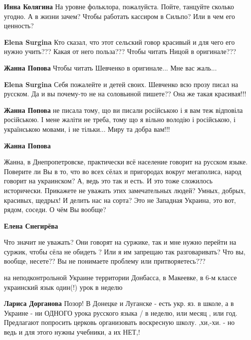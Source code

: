 \begin{itemize}
\begin{itemize}
\textbf{Инна Колягина}
На уровне фольклора, пожалуйста. Пойте, танцуйте сколько угодно. А в жизни зачем? Чтобы работать кассиром в Сильпо? Или в чем его ценность?

\textbf{Elena Surgina}
Кто сказал, что этот сельский говор красивый и для чего его нужно учить??? Какая от него польза??? Чтобы читать Ницой в оригинале???

\textbf{Жанна Попова} Чтобы читать Шевченко в оригинале... Мне вас жаль...

\textbf{Elena Surgina}
Себя пожалейте и детей своих. Шевченко всю прозу писал на русском. Да и вы почему-то не на соловьиной пишете?? Она же такая красивая!!!

\textbf{Жанна Попова} не писала тому, що ви писали російською і я вам теж відповіла російською. І мене жаліти не треба, тому що я вільно володію і російською, і українською мовами, і не тільки... Миру та добра вам!!!

\textbf{Жанна Попова} 

Жанна, в Днепропетровске, практически всё население говорит на русском языке.
Поверите ли Вы в то, что во всех сёлах и пригородах вокруг мегаполиса, народ
говорит на украинском? А, ведь это так и есть. И это тоже сложилось
исторически. Прикажете не уважать этих замечательных людей? Умных, добрых,
красивых, щедрых! И делить нас на сорта? Это не Западная Украина, это вот,
рядом, соседи. О чём Вы вообще?

\textbf{Елена Снегирёва}

Что значит не уважать? Они говорят на суржике, так и мне нужно перейти на
суржик, чтобы сёла не обидеть ? Или я им запрещаю так разговаривать? Что вы,
вообще, несете?? Вы не понимаете проблему или притворяетесь???

\end{itemize} %


на неподконтрольной Украине территории Донбасса, в Макеевке, в 6-м классе
украинский язык один(!) урок в неделю

\begin{itemize} %
\textbf{Лариса Дорганова} Позор! В Донецке и Луганске - есть укр. яз. в школе, а в Украине - ни ОДНОГО урока русского языка / в неделю, или месяц , или год. Предлагают попросить церковь организовать воскресную школу. ,хи,-хи. - но ведь и для этого нужны учебники, а их НЕТ,!


\end{itemize}
\end{itemize}
